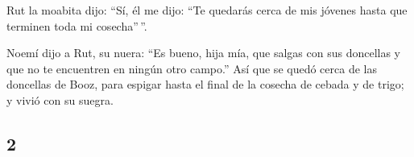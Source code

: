 \begin{paracol}{2}
 Rut la moabita dijo: ``Sí, él me dijo: ``Te quedarás
cerca de mis jóvenes hasta que terminen toda mi cosecha''\,''.

 Noemí dijo a Rut, su nuera: ``Es bueno, hija mía, que
salgas con sus doncellas y que no te encuentren en ningún otro campo.''
 Así que se quedó cerca de las doncellas de Booz, para
espigar hasta el final de la cosecha de cebada y de trigo; y vivió con
su suegra.

\switchcolumn
\begin{otherlanguage}{english}

\hypertarget{section-3}{%
\section{2}\label{section-3}}


\end{otherlanguage}
\end{paracol}
